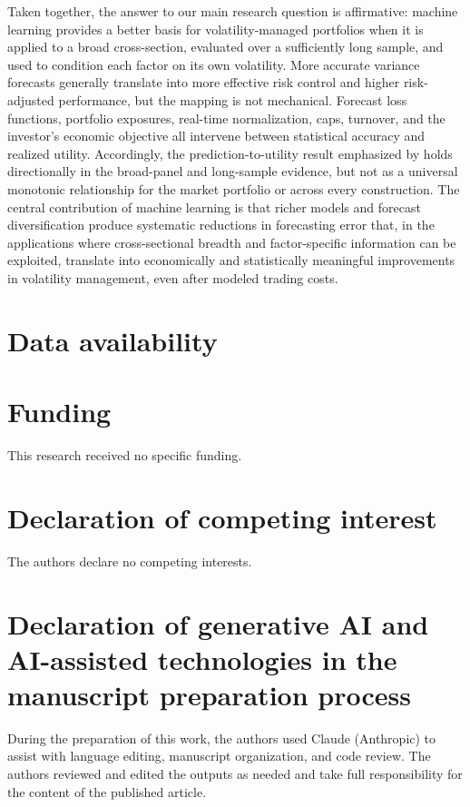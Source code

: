 \documentclass[preprint,12pt,authoryear]{elsarticle}
\begin{document}
Taken together, the answer to our main research question is affirmative: machine learning provides a better basis for volatility-managed portfolios when it is applied to a broad cross-section, evaluated over a sufficiently long sample, and used to condition each factor on its own volatility. More accurate variance forecasts generally translate into more effective risk control and higher risk-adjusted performance, but the mapping is not mechanical. Forecast loss functions, portfolio exposures, real-time normalization, caps, turnover, and the investor's economic objective all intervene between statistical accuracy and realized utility. Accordingly, the prediction-to-utility result emphasized by \citet{bollerslevhoodhusspedersen2018} holds directionally in the broad-panel and long-sample evidence, but not as a universal monotonic relationship for the market portfolio or across every construction. The central contribution of machine learning is that richer models and forecast diversification produce systematic reductions in forecasting error that, in the applications where cross-sectional breadth and factor-specific information can be exploited, translate into economically and statistically meaningful improvements in volatility management, even after modeled trading costs.



\section*{Data availability}

\section*{Funding}
This research received no specific funding.

\section*{Declaration of competing interest}
The authors declare no competing interests.

\section*{Declaration of generative AI and AI-assisted technologies in the manuscript preparation process}

During the preparation of this work, the authors used Claude (Anthropic) to
assist with language editing, manuscript organization, and code review. The
authors reviewed and edited the outputs as needed and take full responsibility
for the content of the published article.
\end{document}
